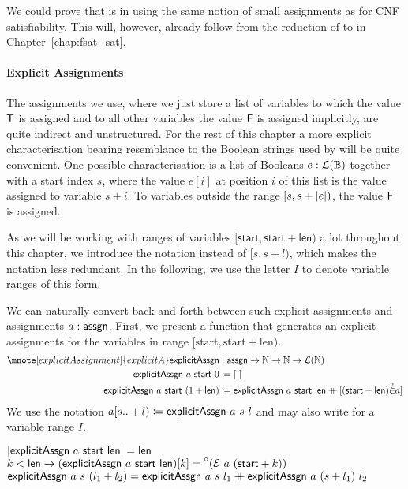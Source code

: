 We could prove that \fsat{} is in \NP{} using the same notion of small assignments as for CNF satisfiability. This will, however, already follow from the reduction of \fsat{} to \SAT{} in Chapter~\ref{chap:fsat_sat}. 

\paragraph{Explicit Assignments}
The assignments we use, where we just store a list of variables to which the value $\mathsf{T}$ is assigned and to all other variables the value $\mathsf{F}$ is assigned implicitly, are quite indirect and unstructured. 
For the rest of this chapter a more explicit characterisation bearing resemblance to the Boolean strings used by \BPR{} will be quite convenient.
One possible characterisation is a list of Booleans $e : \mathcal{L} (\mathbb{B})$ together with a start index $s$, where the value $e[i]$ at position $i$ of this list is the value assigned to variable $s + i$. To variables outside the range $[s, s+|e|)$, the value $\mathsf{F}$ is assigned.

As we will be working with ranges of variables $[\textsf{start}, \textsf{start} + \textsf{len})$ a lot throughout this chapter, we introduce the notation \mnotec{$[s .. +l)$} instead of $[s, s+l)$, which makes the notation less redundant. In the following, we use the letter $I$ to denote variable ranges of this form.

We can naturally convert back and forth between such explicit assignments and assignments $a : \textsf{assgn}$.
First, we present a function that generates an explicit assignments for the variables in range $[\text{start}, \text{start} + \text{len})$. 
%
\newcommand{\explicitA}{\textsf{explicitAssgn}}
\begin{align*}
  \mnote[explicitAssignment]{explicitA}\explicitA &: \assgn \rightarrow \nat \rightarrow \nat \rightarrow \listsof{\nat} \\
  \explicitA~a~\textsf{start}~0 &\defeq \nil \\
  \explicitA~a~\textsf{start}~(\natS{\textsf{len}}) &\defeq \explicitA~a~\textsf{start}~\textsf{len} \concat [(\textsf{start} + \textsf{len}) \oset{?}{\in}{+1.2} a]
\end{align*}
We use the notation $a[s ..+l) \defeq \explicitA~a~s~l$ and may also write  for a variable range $I$.
\begin{lemma}[Properties of \explicitA]\leavevmode
  \begin{enumerate}
     $\length{\explicitA~a~\textsf{start}~\textsf{len}} = \textsf{len}$
     $k < \textsf{len} \rightarrow (\explicitA~a~\textsf{start}~\textsf{len})[k] = \OSome{(\evalA{a}{(\textsf{start} + k)})}$
     $\explicitA~a~s~(l_1 + l_2) = \explicitA~a~s~l_1 \concat \explicitA~a~(s + l_1)~l_2$ 
  \end{enumerate}
\end{lemma}

